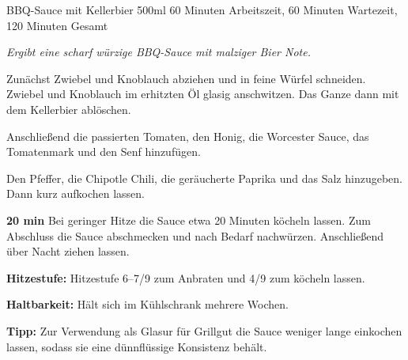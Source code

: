 \begin{recipe}{BBQ-Sauce mit Kellerbier} {500ml} {60 Minuten Arbeitszeit, 60 Minuten Wartezeit, 120 Minuten Gesamt}

  \freeform{}\textit{Ergibt eine scharf würzige BBQ-Sauce mit malziger Bier Note.}


  Zunächst Zwiebel und Knoblauch abziehen und in feine Würfel schneiden.
  Zwiebel und Knoblauch im erhitzten Öl glasig anschwitzen.
  Das Ganze dann mit dem Kellerbier ablöschen.


  Anschließend die passierten Tomaten, den Honig, die Worcester Sauce, das Tomatenmark und den Senf hinzufügen.


  Den Pfeffer, die Chipotle Chili, die geräucherte Paprika und das Salz hinzugeben.
  Dann kurz aufkochen lassen.

  \newstep{}\textbf{20 min}
  Bei geringer Hitze die Sauce etwa 20 Minuten köcheln lassen.
  Zum Abschluss die Sauce abschmecken und nach Bedarf nachwürzen.
  Anschließend über Nacht ziehen lassen.

  \freeform{}\hrulefill{}

  \freeform{}\textbf{Hitzestufe:}
  Hitzestufe 6–7/9 zum Anbraten und 4/9 zum köcheln lassen.

  \freeform{}\textbf{Haltbarkeit:}
  Hält sich im Kühlschrank mehrere Wochen.

  \freeform{}\textbf{Tipp:}
  Zur Verwendung als Glasur für Grillgut die Sauce weniger lange einkochen lassen, sodass sie eine dünnflüssige Konsistenz behält.

\end{recipe}
